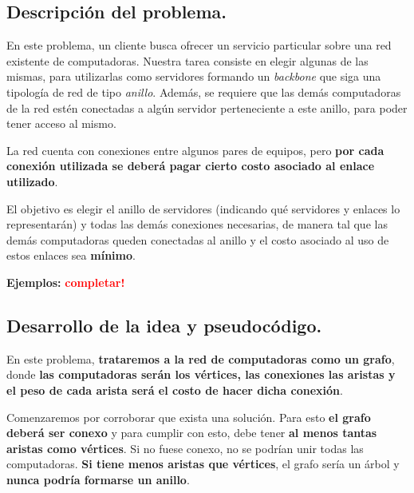 \subsection{Descripción del problema.}

\vspace*{0.3cm}

En este problema, un cliente busca ofrecer un servicio particular sobre una
red existente de computadoras. Nuestra tarea consiste en elegir algunas de las
mismas, para utilizarlas como servidores formando un \textit{backbone} que 
siga una tipología de red de tipo \textit{anillo}. Además, se requiere que 
las demás computadoras de la red estén conectadas a algún servidor 
perteneciente a este anillo, para poder tener acceso al mismo.

La red cuenta con conexiones entre algunos pares de equipos, pero 
\textbf{por cada conexión utilizada se deberá pagar cierto costo 
asociado al enlace utilizado}.

\medskip

El objetivo es elegir el anillo de servidores (indicando qué servidores y
enlaces lo representarán) y todas las demás conexiones necesarias, de 
manera tal que las demás computadoras queden conectadas al anillo y el costo
asociado al uso de estos enlaces sea \textbf{mínimo}.

\vspace*{0.5cm}

\textbf{Ejemplos:}
  \textcolor{red}{\textbf{completar!}}



\newpage
\subsection{Desarrollo de la idea y pseudocódigo.}

\vspace*{0.3cm}

En este problema, \textbf{trataremos a la red de computadoras como un grafo}, 
donde \textbf{las computadoras serán los vértices, las conexiones las aristas 
y el peso de cada arista será el costo de hacer dicha conexión}.

Comenzaremos por corroborar que exista una solución. Para esto \textbf{el  
grafo deberá ser conexo} y para cumplir con esto, debe tener \textbf{al 
menos tantas aristas como vértices}. Si no fuese conexo, no se podrían 
unir todas las computadoras. \textbf{Si tiene menos aristas que vértices}, 
el grafo sería un árbol y \textbf{nunca podría formarse un anillo}.

